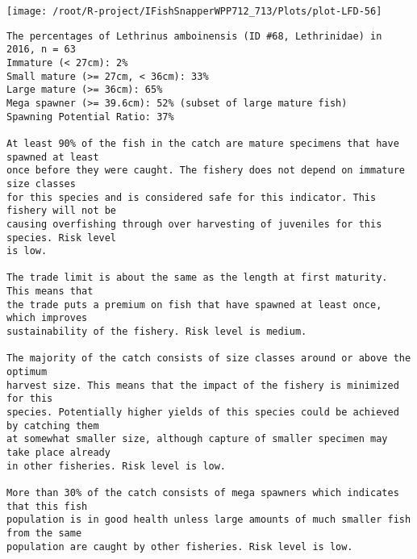 \documentclass{report}\usepackage[]{graphicx}\usepackage[]{color}
\makeatletter
\def\maxwidth{ %
  \ifdim\Gin@nat@width>\linewidth
    \linewidth
  \else
    \Gin@nat@width
  \fi
}
\newenvironment{kframe}{%
 \def\at@end@of@kframe{}%
 \ifinner\ifhmode%
  \def\at@end@of@kframe{\end{minipage}}%
  \begin{minipage}{\columnwidth}%
 \fi\fi%
 \def\FrameCommand##1{\hskip\@totalleftmargin \hskip-\fboxsep
 \colorbox{shadecolor}{##1}\hskip-\fboxsep
     \hskip-\linewidth \hskip-\@totalleftmargin \hskip\columnwidth}%
 \MakeFramed {\advance\hsize-\width
   \@totalleftmargin\z@ \linewidth\hsize
   \@setminipage}}%
 {\par\unskip\endMakeFramed%
 \at@end@of@kframe}
\newenvironment{knitrout}{}{} %
\makeatother
\begin{document}
\begin{knitrout}
\begin{kframe}
{\ttfamily\noindent\color{warningcolor}{Warning in predict.lm(lm\_perc\_imm, newdata = data.frame(x = X)): prediction from a rank-deficient fit may be misleading}}

{\ttfamily\noindent\color{warningcolor}{Warning in predict.lm(lm\_perc\_lmat, newdata = data.frame(x = X)): prediction from a rank-deficient fit may be misleading}}

{\ttfamily\noindent\color{warningcolor}{Warning in predict.lm(lm\_perc\_megasp, newdata = data.frame(x = X)): prediction from a rank-deficient fit may be misleading}}

{\ttfamily\noindent\color{warningcolor}{Warning in predict.lm(lm\_perc\_spr, newdata = data.frame(x = X)): prediction from a rank-deficient fit may be misleading}}\end{kframe}
\texttt{[image: /root/R-project/IFishSnapperWPP712\_713/Plots/plot-LFD-56]} 
\begin{kframe}\begin{verbatim}
The percentages of Lethrinus amboinensis (ID #68, Lethrinidae) in 2016, n = 63
Immature (< 27cm): 2%
Small mature (>= 27cm, < 36cm): 33%
Large mature (>= 36cm): 65%
Mega spawner (>= 39.6cm): 52% (subset of large mature fish)
Spawning Potential Ratio: 37%
 
At least 90% of the fish in the catch are mature specimens that have spawned at least
once before they were caught. The fishery does not depend on immature size classes
for this species and is considered safe for this indicator. This fishery will not be
causing overfishing through over harvesting of juveniles for this species. Risk level
is low.

The trade limit is about the same as the length at first maturity.  This means that
the trade puts a premium on fish that have spawned at least once, which improves
sustainability of the fishery. Risk level is medium.

The majority of the catch consists of size classes around or above the optimum
harvest size. This means that the impact of the fishery is minimized for this
species. Potentially higher yields of this species could be achieved by catching them
at somewhat smaller size, although capture of smaller specimen may take place already
in other fisheries. Risk level is low.

More than 30% of the catch consists of mega spawners which indicates that this fish
population is in good health unless large amounts of much smaller fish from the same
population are caught by other fisheries. Risk level is low.
 

\end{verbatim}
\end{kframe}
\end{knitrout}
\end{document}
